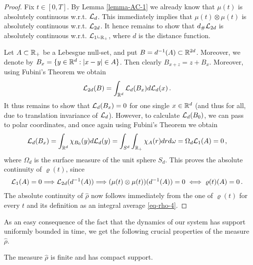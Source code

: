 \begin{proof}
	Fix $t\in [0,T]$. By Lemma \ref{lemma-AC-1} we already know that $\mu(t)$ is absolutely continuous w.r.t.
	$\mathcal{L}_d$. This immediately implies that $\mu(t)\otimes\mu(t)$ is absolutely continuous w.r.t. $\mathcal{L}_{2d}$. It hence
	remains to show that $d_{\#}\mathcal{L}_{2d}$ is absolutely continuous w.r.t. $\mathcal{L}_1\llcorner_{\mathbb{R}_+}$, where $d$ is the distance function.
	
	Let $A\subset\mathbb{R}_+$ be a Lebesgue null-set, and put $B=d^{-1}(A)\subset\mathbb{R}^{2d}$. Moreover, we denote by
	$B_x=\{y\in\mathbb{R}^d:|x-y|\in A\}$. Then clearly $B_{x+z}=z+B_x$. Moreover, using Fubini's Theorem we obtain
	\begin{align*}
		\mathcal{L}_{2d}(B)=\int_{\mathbb{R}^d}\mathcal{L}_d(B_x)d\mathcal{L}_d(x)\,.
	\end{align*}
	It thus remains to show that $\mathcal{L}_d(B_x)=0$ for one single $x\in\mathbb{R}^d$ (and thus for all, due to translation invariance of $\mathcal{L}_d$).
	However, to calculate $\mathcal{L}_d(B_0)$, we can pass to polar coordinates, and once again using Fubini's Theorem
	we obtain
	\begin{align*}
		\mathcal{L}_d(B_x)=\int_{\mathbb{R}^d}\chi_{B_0}(y)d\mathcal{L}_d(y)
			=\int_{S^d}\int_{\mathbb{R}_+}\chi_A(r)dr d\omega=\Omega_d\mathcal{L}_1(A)=0\,,
	\end{align*}
	where $\Omega_d$ is the surface measure of the unit sphere $S_d$. This proves the absolute continuity of
	$\varrho(t)$, since
	\begin{align*}
		\mathcal{L}_1(A)=0\Longrightarrow\mathcal{L}_{2d}(d^{-1}(A))
			\Longrightarrow (\mu(t)\otimes\mu(t))(d^{-1}(A))=0\iff\varrho(t)(A)=0\,.
	\end{align*}
	The absolute continuity of $\widehat \rho$ now follows immediately from the one of $\varrho(t)$ for every $t$ and its
	definition as an integral average \eqref{eq-rho-4}.
\end{proof}

As an easy consequence of the fact that the dynamics of our system has support uniformly bounded in time, we get the following crucial properties of the measure $\widehat \rho$.

\begin{lemma}\label{rhocompact}
	The measure $\widehat \rho$ is finite and has compact support.
\end{lemma}

